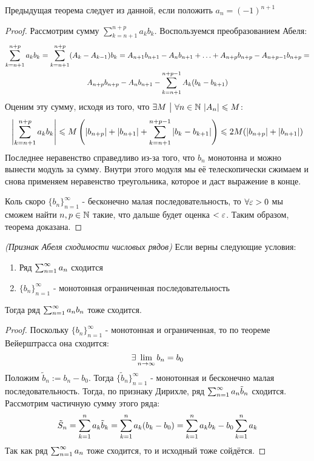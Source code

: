 \begin{note}
	Предыдущая теорема следует из данной, если положить $a_n = (-1)^{n + 1}$
\end{note}

\begin{proof}
	Рассмотрим сумму $\sum_{k = n + 1}^{n + p} a_k b_k$. Воспользуемся преобразованием Абеля:
	\begin{multline*}
		\sum\limits_{k = n + 1}^{n + p} a_k b_k = \sum\limits_{k = n + 1}^{n + p} (A_k - A_{k - 1}) b_k = A_{n + 1} b_{n + 1} - A_n b_{n + 1} + \ldots + A_{n + p} b_{n + p} - A_{n + p - 1} b_{n + p} =
		\\
		A_{n + p} b_{n + p} - A_n b_{n + 1} - \sum\limits_{k = n + 1}^{n + p - 1} A_k (b_k - b_{k + 1})
	\end{multline*}
	Оценим эту сумму, исходя из того, что $\exists M \ \big|\  \forall n \in \mathbb{N}\ |A_n| \leqslant M$:
	\[
		\left|\sum\limits_{k = n + 1}^{n + p} a_k b_k\right| \leqslant M \left(|b_{n + p}| + |b_{n + 1}| + \sum\limits_{k = n + 1}^{n + p - 1} |b_k - b_{k + 1}|\right) \leqslant 2M (|b_{n + p}| + |b_{n + 1}|)
	\]
	Последнее неравенство справедливо из-за того, что $b_n$ монотонна и можно вынести модуль за сумму. Внутри этого модуля мы её телескопически сжимаем и снова применяем неравенство треугольника, которое и даст выражение в конце.
	
	Коль скоро $\{b_n\}_{n = 1}^\infty$ - бесконечно малая последовательность, то $\forall \varepsilon > 0$ мы сможем найти $n, p \in \mathbb{N}$ такие, что дальше будет оценка $< \varepsilon$. Таким образом, теорема доказана.
\end{proof}

\begin{corollary} \textit{(Признак Абеля сходимости числовых рядов)}
	Если верны следующие условия:
	\begin{enumerate}
		\item Ряд $\sum_{n = 1}^\infty a_n$ сходится
		
		\item $\{b_n\}_{n = 1}^\infty$ - монотонная ограниченная последовательность
	\end{enumerate}
	Тогда ряд $\sum_{n = 1}^\infty a_n b_n$ тоже сходится.
\end{corollary}

\begin{proof}
	Поскольку $\{b_n\}_{n = 1}^\infty$ - монотонная и ограниченная, то по теореме Вейерштрасса она сходится:
	\[
		\exists \lim\limits_{n \to \infty} b_n = b_0
	\]
	Положим $\tilde{b}_n := b_n - b_0$. Тогда $\{\tilde{b}_n\}_{n = 1}^\infty$ - монотонная и бесконечно малая последовательность. Тогда, по признаку Дирихле, ряд $\sum_{n = 1}^\infty a_n \tilde{b}_n$ сходится. Рассмотрим частичную сумму этого ряда:
	\[
		\tilde{S}_n = \sum\limits_{k = 1}^n a_k \tilde{b}_k = \sum\limits_{k = 1}^n a_k (b_k - b_0) = \sum\limits_{k = 1}^n a_k b_k - b_0\sum\limits_{k = 1}^n a_k
	\]
	Так как ряд $\sum_{n = 1}^\infty a_n$ тоже сходится, то и исходный тоже сойдётся.
\end{proof}

